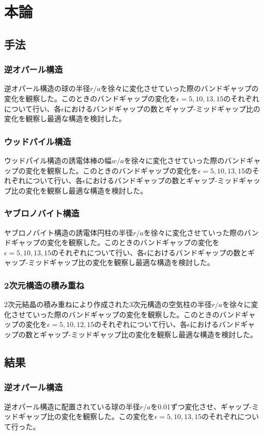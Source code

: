 \documentclass[platex,dvipdfmx]{jsreport}
\numberwithin{equation}{section}
\begin{document}
\chapter{本論}

\section{手法}
\subsection{逆オパール構造}
逆オパール構造の球の半径$r / a$を徐々に変化させていった際のバンドギャップの変化を観察した。このときのバンドギャップの変化を$\epsilon = 5, 10, 13, 15$のそれぞれについて行い、各$\epsilon$におけるバンドギャップの数とギャップ-ミッドギャップ比の変化を観察し最適な構造を検討した。
\subsection{ウッドパイル構造}
ウッドパイル構造の誘電体棒の幅$w / a$を徐々に変化させていった際のバンドギャップの変化を観察した。このときのバンドギャップの変化を$\epsilon = 5, 10, 13, 15$のそれぞれについて行い、各$\epsilon$におけるバンドギャップの数とギャップ-ミッドギャップ比の変化を観察し最適な構造を検討した。
\subsection{ヤブロノバイト構造}
ヤブロノバイト構造の誘電体円柱の半径$r / a$を徐々に変化させていった際のバンドギャップの変化を観察した。このときのバンドギャップの変化を$\epsilon = 5, 10, 13, 15$のそれぞれについて行い、各$\epsilon$におけるバンドギャップの数とギャップ-ミッドギャップ比の変化を観察し最適な構造を検討した。
\subsection{2次元構造の積み重ね}
2次元結晶の積み重ねにより作成された3次元構造の空気柱の半径$r / a$を徐々に変化させていった際のバンドギャップの変化を観察した。このときのバンドギャップの変化を$\epsilon = 5, 10, 12, 15$のそれぞれについて行い、各$\epsilon$におけるバンドギャップの数とギャップ-ミッドギャップ比の変化を観察し最適な構造を検討した。


\section{結果}
\subsection{逆オパール構造}
逆オパール構造に配置されている球の半径$r / a$を0.01ずつ変化させ、ギャップ-ミッドギャップ比の変化を観察した。この変化を$\epsilon = 5, 10, 13, 15$のそれぞれについて行った。
\end{document}
